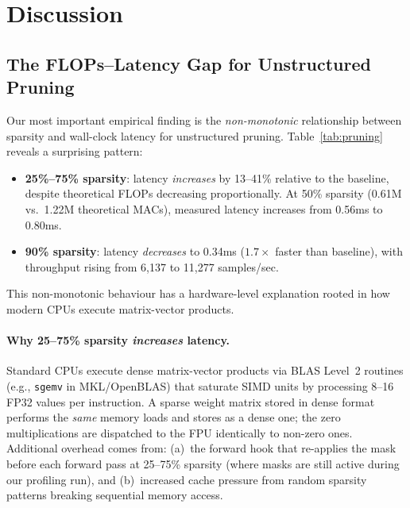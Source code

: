 \section{Discussion}
\label{sec:discussion}

\subsection{The FLOPs--Latency Gap for Unstructured Pruning}

Our most important empirical finding is the \emph{non-monotonic} relationship
between sparsity and wall-clock latency for unstructured pruning.
Table~\ref{tab:pruning} reveals a surprising pattern:

\begin{itemize}[leftmargin=1.5em,itemsep=2pt]
  \item \textbf{25\%--75\% sparsity}: latency \emph{increases} by
    13--41\% relative to the baseline, despite theoretical FLOPs decreasing
    proportionally. At 50\% sparsity (0.61M vs.\ 1.22M theoretical MACs),
    measured latency increases from 0.56ms to 0.80ms.
  \item \textbf{90\% sparsity}: latency \emph{decreases} to 0.34ms
    ($1.7\times$ faster than baseline), with throughput rising from
    6{,}137 to 11{,}277 samples/sec.
\end{itemize}

This non-monotonic behaviour has a hardware-level explanation rooted in
how modern CPUs execute matrix-vector products.

\paragraph{Why 25--75\% sparsity \emph{increases} latency.}
Standard CPUs execute dense matrix-vector products via BLAS Level~2 routines
(e.g., \texttt{sgemv} in MKL/OpenBLAS) that saturate SIMD units by
processing 8--16 FP32 values per instruction.
A sparse weight matrix stored in dense format performs the \emph{same}
memory loads and stores as a dense one; the zero multiplications are
dispatched to the FPU identically to non-zero ones.
Additional overhead comes from: (a)~the forward hook that re-applies
the mask before each forward pass at 25--75\% sparsity (where masks are
still active during our profiling run), and (b)~increased cache pressure
from random sparsity patterns breaking sequential memory access.

